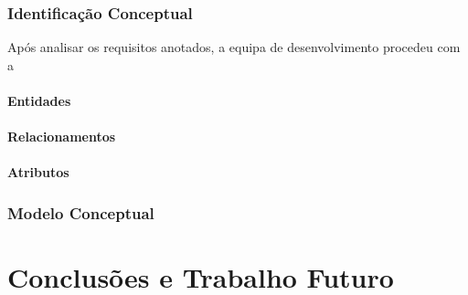 \documentclass[a4paper,12pt]{scrreprt}
\begin{document}
        \subsection{Identificação Conceptual}
             Após analisar os requisitos anotados, a equipa de desenvolvimento procedeu com a 
             \subsubsection{Entidades}
             \subsubsection{Relacionamentos}
             \subsubsection{Atributos}
        \subsection{Modelo Conceptual}
        
        

    

\chapter{Conclusões e Trabalho Futuro}
    



\renewcommand\bibname{Referências}

\nocite{*}
\printbibliography


\end{document}
